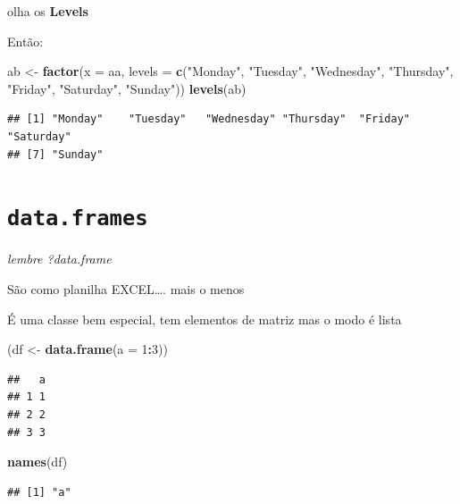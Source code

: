 \documentclass[]{book}
\newenvironment{Shaded}{\begin{snugshade}}{\end{snugshade}}
\newcommand{\KeywordTok}[1]{\textcolor[rgb]{0.13,0.29,0.53}{\textbf{#1}}}
\newcommand{\DataTypeTok}[1]{\textcolor[rgb]{0.13,0.29,0.53}{#1}}
\newcommand{\DecValTok}[1]{\textcolor[rgb]{0.00,0.00,0.81}{#1}}
\newcommand{\StringTok}[1]{\textcolor[rgb]{0.31,0.60,0.02}{#1}}
\newcommand{\OperatorTok}[1]{\textcolor[rgb]{0.81,0.36,0.00}{\textbf{#1}}}
\newcommand{\NormalTok}[1]{#1}
\theoremstyle{definition}
\theoremstyle{definition}
\theoremstyle{definition}
\theoremstyle{remark}
\begin{document}
olha os \textbf{Levels}

Então:

\begin{Shaded}
\begin{Highlighting}[]
\NormalTok{ab <-}\StringTok{ }\KeywordTok{factor}\NormalTok{(}\DataTypeTok{x =}\NormalTok{ aa,}
             \DataTypeTok{levels =} \KeywordTok{c}\NormalTok{(}\StringTok{"Monday"}\NormalTok{, }\StringTok{"Tuesday"}\NormalTok{,  }\StringTok{"Wednesday"}\NormalTok{,  }\StringTok{"Thursday"}\NormalTok{,}
                        \StringTok{"Friday"}\NormalTok{, }\StringTok{"Saturday"}\NormalTok{, }\StringTok{"Sunday"}\NormalTok{))}
\KeywordTok{levels}\NormalTok{(ab)}
\end{Highlighting}
\end{Shaded}

\begin{verbatim}
## [1] "Monday"    "Tuesday"   "Wednesday" "Thursday"  "Friday"    "Saturday" 
## [7] "Sunday"
\end{verbatim}

\section{\texorpdfstring{\texttt{data.frames}}{data.frames}}\label{data.frames}

\emph{lembre ?data.frame}

São como planilha EXCEL\ldots{}. mais o menos

É uma classe bem especial, tem elementos de matriz mas o modo é lista

\begin{Shaded}
\begin{Highlighting}[]
\NormalTok{(df <-}\StringTok{ }\KeywordTok{data.frame}\NormalTok{(}\DataTypeTok{a =} \DecValTok{1}\OperatorTok{:}\DecValTok{3}\NormalTok{))}
\end{Highlighting}
\end{Shaded}

\begin{verbatim}
##   a
## 1 1
## 2 2
## 3 3
\end{verbatim}

\begin{Shaded}
\begin{Highlighting}[]
\KeywordTok{names}\NormalTok{(df)}
\end{Highlighting}
\end{Shaded}

\begin{verbatim}
## [1] "a"
\end{verbatim}
\end{document}
